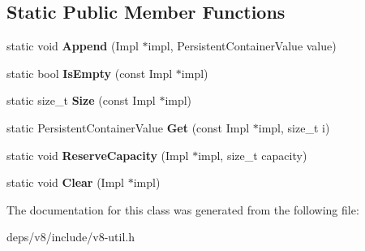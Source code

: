 \subsection*{Static Public Member Functions}
\begin{DoxyCompactItemize}
\item 
\hypertarget{classv8_1_1_default_persistent_value_vector_traits_ac3088f4b37e68ca9ed668a859f89cf21}{}static void {\bfseries Append} (Impl $\ast$impl, Persistent\+Container\+Value value)\label{classv8_1_1_default_persistent_value_vector_traits_ac3088f4b37e68ca9ed668a859f89cf21}

\item 
\hypertarget{classv8_1_1_default_persistent_value_vector_traits_a5b410d98817c143d2a3bf0e9dac34bd0}{}static bool {\bfseries Is\+Empty} (const Impl $\ast$impl)\label{classv8_1_1_default_persistent_value_vector_traits_a5b410d98817c143d2a3bf0e9dac34bd0}

\item 
\hypertarget{classv8_1_1_default_persistent_value_vector_traits_a49748bb910ea3482c078c1a8e566bd44}{}static size\+\_\+t {\bfseries Size} (const Impl $\ast$impl)\label{classv8_1_1_default_persistent_value_vector_traits_a49748bb910ea3482c078c1a8e566bd44}

\item 
\hypertarget{classv8_1_1_default_persistent_value_vector_traits_ab9787aa7b041a30714cd17258c886cd7}{}static Persistent\+Container\+Value {\bfseries Get} (const Impl $\ast$impl, size\+\_\+t i)\label{classv8_1_1_default_persistent_value_vector_traits_ab9787aa7b041a30714cd17258c886cd7}

\item 
\hypertarget{classv8_1_1_default_persistent_value_vector_traits_afda15875d9691152b30549e4dbe4eb95}{}static void {\bfseries Reserve\+Capacity} (Impl $\ast$impl, size\+\_\+t capacity)\label{classv8_1_1_default_persistent_value_vector_traits_afda15875d9691152b30549e4dbe4eb95}

\item 
\hypertarget{classv8_1_1_default_persistent_value_vector_traits_ab15a15e95f274defd3362536ae502361}{}static void {\bfseries Clear} (Impl $\ast$impl)\label{classv8_1_1_default_persistent_value_vector_traits_ab15a15e95f274defd3362536ae502361}

\end{DoxyCompactItemize}


The documentation for this class was generated from the following file\+:\begin{DoxyCompactItemize}
\item 
deps/v8/include/v8-\/util.\+h\end{DoxyCompactItemize}
